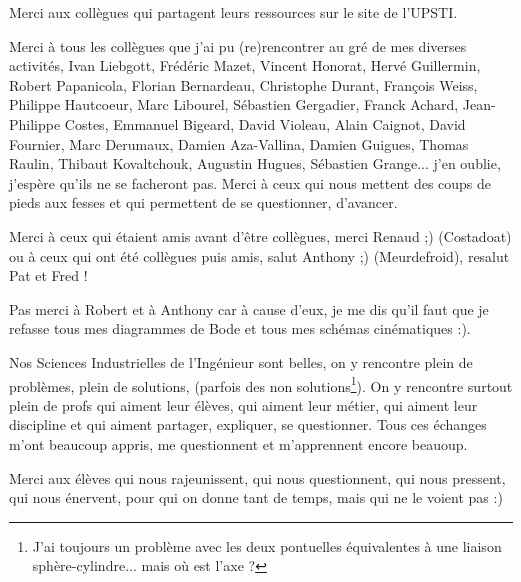 Merci aux collègues qui partagent leurs ressources sur le site de l'UPSTI.

Merci à tous les collègues que j'ai pu (re)rencontrer au gré de mes diverses activités, Ivan Liebgott, Frédéric Mazet, Vincent Honorat, Hervé Guillermin, Robert Papanicola, Florian Bernardeau, Christophe Durant, François Weiss, Philippe Hautcoeur, Marc Libourel, Sébastien Gergadier, Franck Achard, Jean-Philippe Costes, Emmanuel Bigeard, David Violeau, Alain Caignot, David Fournier, Marc Derumaux, Damien Aza-Vallina, Damien Guigues, Thomas Raulin, Thibaut Kovaltchouk, Augustin Hugues, Sébastien Grange... j'en oublie, j'espère qu'ils ne se facheront pas. Merci à ceux qui nous mettent des coups de pieds aux fesses et qui permettent de se questionner, d'avancer. 

Merci à ceux qui étaient amis avant d'être collègues, merci Renaud ;) (Costadoat) ou à ceux qui ont été collègues puis amis, salut Anthony ;) (Meurdefroid), resalut Pat et Fred !

Pas merci à Robert et à Anthony car à cause d'eux, je me dis qu'il faut que je refasse tous mes diagrammes de Bode et tous mes schémas cinématiques :).


Nos Sciences Industrielles de l'Ingénieur sont belles, on y rencontre plein de problèmes, plein de solutions,  (parfois des non solutions\footnote{J'ai toujours un problème avec les deux pontuelles équivalentes à une liaison sphère-cylindre... mais où est l'axe ?}). 
On y rencontre surtout plein de profs qui aiment leur élèves, qui aiment leur métier, qui aiment leur discipline et qui aiment partager, expliquer, se questionner. Tous ces échanges m'ont beaucoup appris, me questionnent et m'apprennent encore beauoup. 

Merci aux élèves qui nous rajeunissent, qui nous questionnent, qui nous pressent, qui nous énervent, pour qui on donne tant de temps, mais qui ne le voient pas :)

